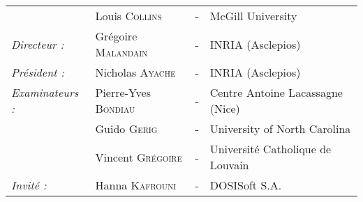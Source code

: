 \begin{titlepage}
\begin{center}
\begin{tabular}{llcl}
				& Louis \textsc{Collins}		& - & McGill University\\
      \textit{Directeur :}	& Grégoire \textsc{Malandain}		& - & INRIA (Asclepios)\\
      \textit{Président :}	& Nicholas \textsc{Ayache}		& - & INRIA (Asclepios)\\
      \textit{Examinateurs :}   & Pierre-Yves \textsc{Bondiau}          & - & Centre Antoine Lacassagne (Nice)\\
      				& Guido \textsc{Gerig}			& - & University of North Carolina\\
      				& Vincent \textsc{Grégoire}		& - & Université Catholique de Louvain\\
      \textit{Invité :}		& Hanna \textsc{Kafrouni}		& - & DOSISoft S.A.
\end{tabular}
\end{center}
\end{titlepage}

\sloppy

\titlepage
